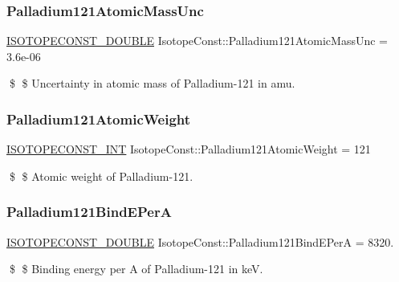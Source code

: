 \subsubsection{\texorpdfstring{Palladium121\+Atomic\+Mass\+Unc}{Palladium121AtomicMassUnc}}
{\footnotesize\ttfamily \mbox{\hyperlink{group___isotope_const-_macros_ga8f45a7272ce02c0b4c65c44636ed719a}{I\+S\+O\+T\+O\+P\+E\+C\+O\+N\+S\+T\+\_\+\+D\+O\+U\+B\+LE}} Isotope\+Const\+::\+Palladium121\+Atomic\+Mass\+Unc = 3.\+6e-\/06}

\$ \$ Uncertainty in atomic mass of Palladium-\/121 in amu. \mbox{\label{group___isotope_const-_palladium-_pd121_ga45a30aef0acd2d1e7c793511e651d3dc}} 
\subsubsection{\texorpdfstring{Palladium121\+Atomic\+Weight}{Palladium121AtomicWeight}}
{\footnotesize\ttfamily \mbox{\hyperlink{group___isotope_const-_macros_ga5f18360b3e99483a35c32d789e62621c}{I\+S\+O\+T\+O\+P\+E\+C\+O\+N\+S\+T\+\_\+\+I\+NT}} Isotope\+Const\+::\+Palladium121\+Atomic\+Weight = 121}

\$ \$ Atomic weight of Palladium-\/121. \mbox{\label{group___isotope_const-_palladium-_pd121_gaf89bdcec958dcca73c60c0b8a0a1ec5a}} 
\subsubsection{\texorpdfstring{Palladium121\+Bind\+E\+PerA}{Palladium121BindEPerA}}
{\footnotesize\ttfamily \mbox{\hyperlink{group___isotope_const-_macros_ga8f45a7272ce02c0b4c65c44636ed719a}{I\+S\+O\+T\+O\+P\+E\+C\+O\+N\+S\+T\+\_\+\+D\+O\+U\+B\+LE}} Isotope\+Const\+::\+Palladium121\+Bind\+E\+PerA = 8320.}

\$ \$ Binding energy per A of Palladium-\/121 in keV. \mbox{\label{group___isotope_const-_palladium-_pd121_ga76fcac418d406e8d0f3ae5316fdc433c}} 
